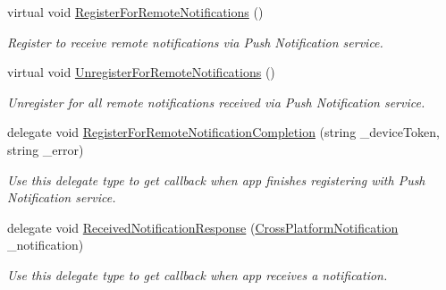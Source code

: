 \begin{DoxyCompactItemize}
virtual void \hyperlink{class_voxel_busters_1_1_native_plugins_1_1_notification_service_ab0d332cef9e48924c9b4c10e8a3bf534}{Register\+For\+Remote\+Notifications} ()
\begin{DoxyCompactList}\small\item\em Register to receive remote notifications via Push Notification service. \end{DoxyCompactList}\item 
virtual void \hyperlink{class_voxel_busters_1_1_native_plugins_1_1_notification_service_a6f4ecad241e4f2dd070aa56e62e08ca1}{Unregister\+For\+Remote\+Notifications} ()
\begin{DoxyCompactList}\small\item\em Unregister for all remote notifications received via Push Notification service. \end{DoxyCompactList}\item 
delegate void \hyperlink{class_voxel_busters_1_1_native_plugins_1_1_notification_service_ae68c46f5013c239b682e24ec68638aa6}{Register\+For\+Remote\+Notification\+Completion} (string \+\_\+device\+Token, string \+\_\+error)
\begin{DoxyCompactList}\small\item\em Use this delegate type to get callback when app finishes registering with Push Notification service. \end{DoxyCompactList}\item 
delegate void \hyperlink{class_voxel_busters_1_1_native_plugins_1_1_notification_service_abbbb745d69a5113b081d85f4b4660890}{Received\+Notification\+Response} (\hyperlink{class_voxel_busters_1_1_native_plugins_1_1_cross_platform_notification}{Cross\+Platform\+Notification} \+\_\+notification)
\begin{DoxyCompactList}\small\item\em Use this delegate type to get callback when app receives a notification. \end{DoxyCompactList}\end{DoxyCompactItemize}
